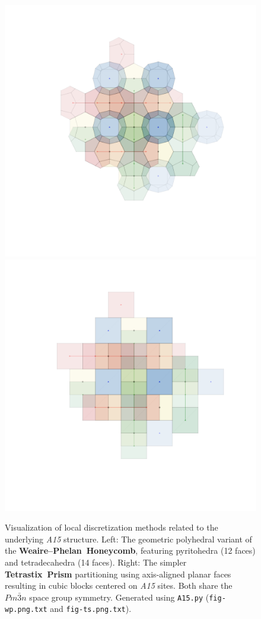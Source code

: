 \documentclass[10pt]{article}
\def\AAAB{\textit{A15}}
\def\WP{Weaire--Phelan}
\def\WPH{\WP{}~Honeycomb}
\def\TSP{Tetrastix~Prism}
\begin{document}
\begin{figure}[!ht]
    \capstart
    \centering
    \includegraphics[trim={130 140 80 50}, scale=0.35]{fig-wp}%
    \includegraphics[trim={130 140 80 50}, scale=0.35]{fig-ts}
    \caption{Visualization of local discretization methods related to the underlying \AAAB{} structure. Left: The geometric polyhedral variant of the \textbf{\WPH{}}, featuring pyritohedra (12 faces) and tetradecahedra (14 faces). Right: The simpler \textbf{\TSP{}} partitioning using axis-aligned planar faces resulting in cubic blocks centered on \AAAB{} sites. Both share the $Pm\bar{3}n$ space group symmetry. Generated using \texttt{A15.py} (\texttt{fig-wp.png.txt} and \texttt{fig-ts.png.txt}).}
    \label{fig:wp-ts}
\end{figure}
\end{document}
